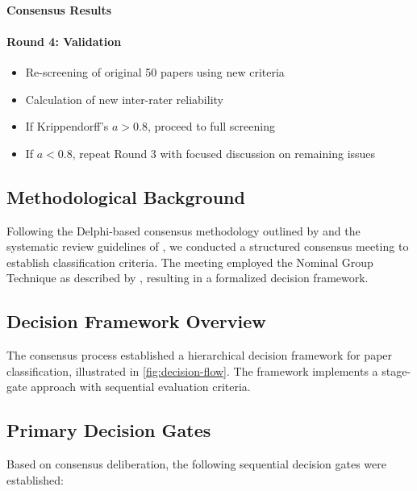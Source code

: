 \documentclass[acmsmall]{acmart}
\begin{document}
\begin{enumerate}
          \paragraph{Consensus Results}

          \paragraph{Round 4: Validation}
          \begin{itemize}
              \item Re-screening of original 50 papers using new criteria
              \item Calculation of new inter-rater reliability
              \item If Krippendorff's $a > 0.8$, proceed to full screening
              \item If $a < 0.8$, repeat Round 3 with focused discussion on remaining issues
          \end{itemize}
\end{enumerate}

\subsection{Methodological Background}\label{subsec:methodological-background}
Following the Delphi-based consensus methodology outlined by \citet{dalkey1963experimental} and the systematic review guidelines of \citet{kitchenham2004procedures}, we conducted a structured consensus meeting to establish classification criteria. The meeting employed the Nominal Group Technique as described by \citet{delbecq1971group}, resulting in a formalized decision framework.

\subsection{Decision Framework Overview}\label{subsec:decision-framework-overview}
The consensus process established a hierarchical decision framework for paper classification, illustrated in \cref{fig:decision-flow}. The framework implements a stage-gate approach with sequential evaluation criteria.

\subsection{Primary Decision Gates}\label{subsec:primary-decision-gates}
Based on consensus deliberation, the following sequential decision gates were established:
\end{document}
